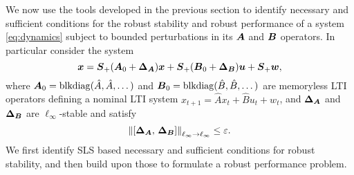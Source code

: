 We now use the tools developed in the previous section to identify necessary and sufficient conditions for the robust stability and robust performance of a system \eqref{eq:dynamics} subject to bounded perturbations in its $\boldsymbol{A}$ and $\boldsymbol{B}$ operators.  In particular consider the system
\begin{equation}
\boldsymbol{x} = \boldsymbol{S}_+(\boldsymbol{A}_0 + {\boldsymbol{\Delta}}_{\boldsymbol{A}})\boldsymbol{x} + \boldsymbol{S}_+(\boldsymbol{B}_0 + {\boldsymbol{\Delta}}_{\boldsymbol{B}})\boldsymbol{u} + \boldsymbol{S}_+ \boldsymbol{w},
\label{eq:uncertain-dynamics}
\end{equation}
where $\boldsymbol{A}_0 = \mathrm{blkdiag}(\hat A,\hat A,\dots)$ and $\boldsymbol{B}_0 = \mathrm{blkdiag}(\hat B, \hat B,\dots)$ are memoryless LTI operators defining a nominal LTI system $x_{t+1} = \hat Ax_t + \hat Bu_t + w_t$, and ${\boldsymbol{\Delta}}_{\boldsymbol{A}}$ and ${\boldsymbol{\Delta}}_{\boldsymbol{B}}$ are $\ell_\infty$-stable and satisfy 
\begin{equation}
\left\|[{\boldsymbol{\Delta}}_{\boldsymbol{A}},\, {\boldsymbol{\Delta}}_{\boldsymbol{B}}]\right\|_{\ell_\infty\to\ell_\infty}\leq \varepsilon.
\label{eq:eps-bound}
\end{equation}
We first identify SLS based necessary and sufficient conditions for robust stability, and then build upon those to formulate a robust performance problem.  

